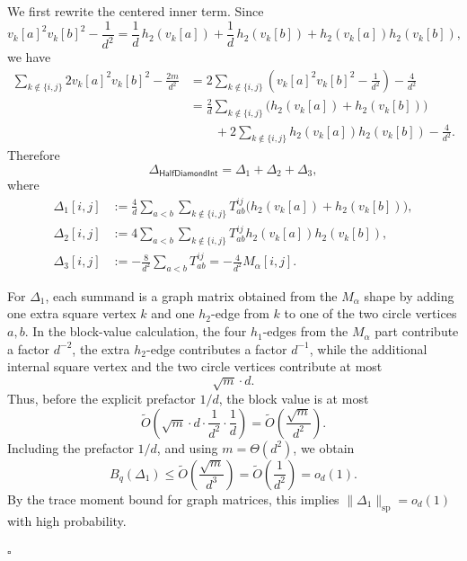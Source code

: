 \documentclass[10pt,a4paper]{amsart}
\renewenvironment{proof}{{\emph{Proof.}  }}{\hfill$\square$ \vspace{8pt}}
\begin{document}
\begin{proof}
We first rewrite the centered inner term. Since
\[
    v_k[a]^2v_k[b]^2-\frac1{d^2}
    =
    \frac1d\,h_2(v_k[a])
    +
    \frac1d\,h_2(v_k[b])
    +
    h_2(v_k[a])h_2(v_k[b]),
\]
we have
\[
\begin{aligned}
    \sum_{k\notin\{i,j\}}2v_k[a]^2v_k[b]^2-\frac{2m}{d^2}
    &=
    2\sum_{k\notin\{i,j\}}
    \left(
        v_k[a]^2v_k[b]^2-\frac1{d^2}
    \right)
    -
    \frac{4}{d^2}                                               \\
    &=
    \frac{2}{d}
    \sum_{k\notin\{i,j\}}
    \bigl(h_2(v_k[a])+h_2(v_k[b])\bigr)                         \\
    &\qquad
    +
    2\sum_{k\notin\{i,j\}}
    h_2(v_k[a])h_2(v_k[b])
    -
    \frac{4}{d^2}.
\end{aligned}
\]
Therefore
\[
    \Delta_{\mathsf{HalfDiamondInt}}
    =
    \Delta_1+\Delta_2+\Delta_3,
\]
where
\[
\begin{aligned}
    \Delta_1[i,j]
    &:=
    \frac{4}{d}
    \sum_{a<b}
    \sum_{k\notin\{i,j\}}
    T_{ab}^{ij}
    \bigl(h_2(v_k[a])+h_2(v_k[b])\bigr),                       \\
    \Delta_2[i,j]
    &:=
    4
    \sum_{a<b}
    \sum_{k\notin\{i,j\}}
    T_{ab}^{ij}
    h_2(v_k[a])h_2(v_k[b]),                                    \\
    \Delta_3[i,j]
    &:=
    -\frac{8}{d^2}
    \sum_{a<b}T_{ab}^{ij}
    =
    -\frac{4}{d^2}M_\alpha[i,j].
\end{aligned}
\]

For \(\Delta_1\), each summand is a graph matrix obtained from the \(M_\alpha\) shape by adding
one extra square vertex \(k\) and one \(h_2\)-edge from \(k\) to one of the two circle vertices
\(a,b\). In the block-value calculation, the four \(h_1\)-edges from the \(M_\alpha\) part contribute
a factor \(d^{-2}\), the extra \(h_2\)-edge contributes a factor \(d^{-1}\), while the additional internal
square vertex and the two circle vertices contribute at most
\[
    \sqrt m\cdot d.
\]
Thus, before the explicit prefactor \(1/d\), the block value is at most
\[
    \widetilde O\!\left(
        \sqrt m\cdot d\cdot \frac1{d^2}\cdot \frac1d
    \right)
    =
    \widetilde O\!\left(\frac{\sqrt m}{d^2}\right).
\]
Including the prefactor \(1/d\), and using \(m=\Theta(d^2)\), we obtain
\[
    B_q(\Delta_1)
    \le
    \widetilde O\!\left(\frac{\sqrt m}{d^3}\right)
    =
    \widetilde O\!\left(\frac1{d^2}\right)
    =
    o_d(1).
\]
By the trace moment bound for graph matrices, this implies
\(
    \|\Delta_1\|_{\mathrm{sp}}=o_d(1)
\)
with high probability.


\end{proof}
\end{document}

